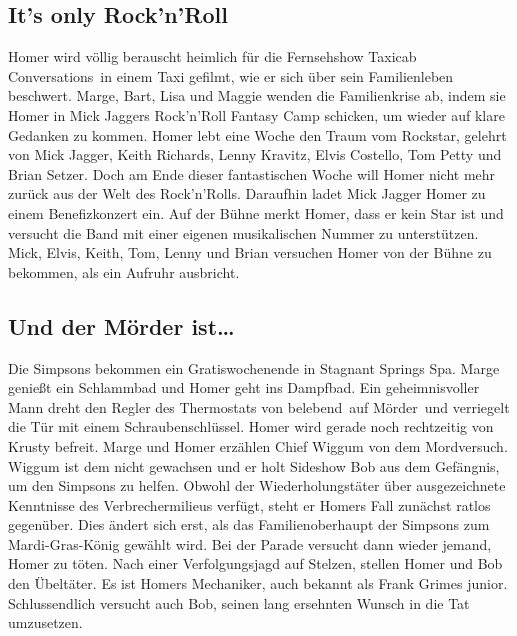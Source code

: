 \subsection{It's only Rock'n'Roll}\label{DABF22}
Homer wird völlig berauscht heimlich für die Fernsehshow \glqq Taxicab Conversations\grqq\ in einem Taxi gefilmt, wie er sich über sein Familienleben beschwert. Marge, Bart, Lisa und Maggie wenden die Familienkrise ab, indem sie Homer in Mick Jaggers Rock'n'Roll Fantasy Camp schicken, um wieder auf klare Gedanken zu kommen. Homer lebt eine Woche den Traum vom Rockstar, gelehrt von Mick Jagger, Keith Richards, Lenny Kravitz, Elvis Costello, Tom Petty und Brian Setzer. Doch am Ende dieser fantastischen Woche will Homer nicht mehr zurück aus der Welt des Rock'n'Rolls. Daraufhin ladet Mick Jagger Homer zu einem Benefizkonzert ein. Auf der Bühne merkt Homer, dass er kein Star ist und versucht die Band mit einer eigenen musikalischen Nummer zu unterstützen. Mick, Elvis, Keith, Tom, Lenny und Brian versuchen Homer von der Bühne zu bekommen, als ein Aufruhr ausbricht.


\subsection{Und der Mörder ist\dots}\label{EABF01}
Die Simpsons bekommen ein Gratiswochenende in \glqq Stagnant Springs Spa\grqq . Marge genießt ein Schlammbad und Homer geht ins Dampfbad. Ein geheimnisvoller Mann dreht den Regler des Thermostats von \glqq belebend\grqq\ auf \glqq Mörder\grqq\ und verriegelt die Tür mit einem Schraubenschlüssel. Homer wird gerade noch rechtzeitig von Krusty befreit. Marge und Homer erzählen Chief Wiggum von dem Mordversuch. Wiggum ist dem nicht gewachsen und er holt Sideshow Bob aus dem Gefängnis, um den Simpsons zu helfen. Obwohl der Wiederholungstäter über ausgezeichnete Kenntnisse des Verbrechermilieus verfügt, steht er Homers Fall zunächst ratlos gegenüber. Dies ändert sich erst, als das Familienoberhaupt der Simpsons zum Mardi-Gras-König gewählt wird. Bei der Parade versucht dann wieder jemand, Homer zu töten. Nach einer Verfolgungsjagd auf Stelzen, stellen Homer und Bob den Übeltäter. Es ist Homers Mechaniker, auch bekannt als Frank Grimes junior. Schlussendlich versucht auch Bob, seinen lang ersehnten Wunsch in die Tat umzusetzen.

